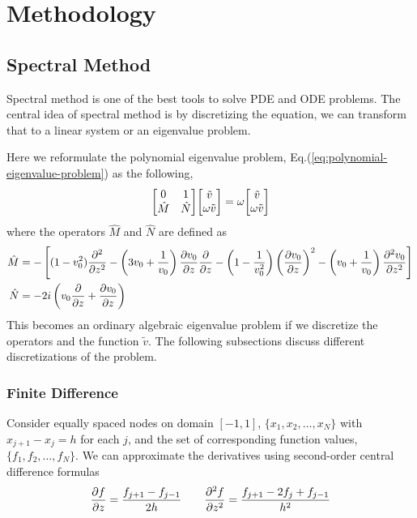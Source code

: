 \chapter{Methodology} \label{chap:methodology}

\section{Spectral Method}
Spectral method is one of the best tools to solve PDE and ODE problems. \cite{trefethen_spectral_nodate} The central idea of spectral method is by discretizing the equation, we can transform that to a linear system or an eigenvalue problem.

Here we reformulate the polynomial eigenvalue problem, Eq.(\ref{eq:polynomial-eigenvalue-problem}) as the following, 
\begin{equation} \label{eq:eigenvalue-problem}
	\mqty[ 0 & 1\\ \hat{M} & \hat{N} ]\mqty[ \tilde{v}\\ \omega \tilde{v}] = \omega\mqty[ \tilde{v}\\ \omega \tilde{v}]
\end{equation}
where the operators $\hat{M}$ and $\hat{N}$ are defined as
\begin{align*}
	\hat{M} &= -\left[(1-v_0^2)\pdv[2]{}{z} 
	-\left(3v_0 + \frac{1}{v_0}\right)\pdv{v_0}{z}\pdv{}{z} 
	- \left(1-\frac{1}{v_0^2}\right)\left(\pdv{v_0}{z}\right)^2 
	- \left(v_0+\frac{1}{v_0}\right)\pdv[2]{v_0}{z}\right] \\
	\hat{N} &= -2i\left(v_0\pdv{}{z} +\pdv{v_0}{z} \right) 
\end{align*}
This becomes an ordinary algebraic eigenvalue problem if we discretize the operators and the function $\tilde{v}$. The following subsections discuss different discretizations of the problem.

\subsection{Finite Difference}
Consider equally spaced nodes on domain $[-1,1]$, $\{x_1, x_2, \dots, x_N\}$ with $x_{j+1}-x_{j} = h$ for each $j$, and the set of corresponding function values, $\{ f_1, f_2, \dots, f_N \}$. We can approximate the derivatives using second-order central difference formulas
\[ 
\pdv{f}{z} = \frac{f_{j+1} - f_{j-1}}{2h}
\qquad
\pdv[2]{f}{z} = \frac{f_{j+1} -2f_{j} +f_{j-1}}{h^2}
\]

